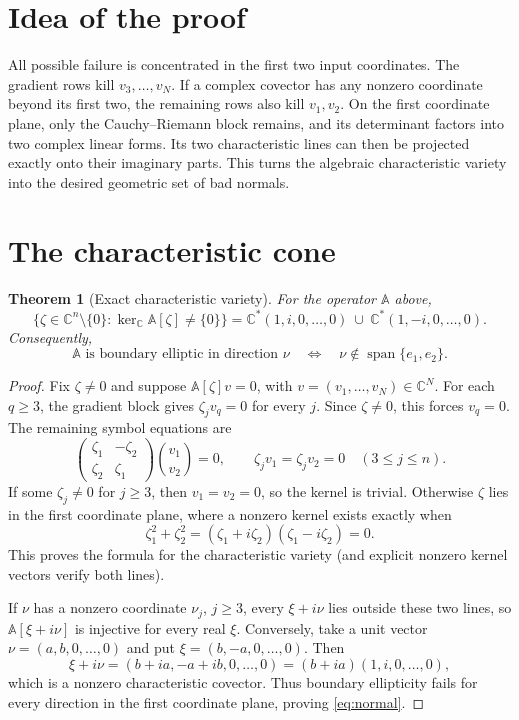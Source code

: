 \documentclass[11pt]{article}
\newtheorem{theorem}{Theorem}
\newcommand{\C}{\mathbb C}
\newcommand{\A}{\mathbb A}
\begin{document}
\section{Idea of the proof}

All possible failure is concentrated in the first two input coordinates.
The gradient rows kill $v_3,\ldots,v_N$.  If a complex covector has any
nonzero coordinate beyond its first two, the remaining rows also kill
$v_1,v_2$.  On the first coordinate plane, only the Cauchy--Riemann block
remains, and its determinant factors into two complex linear forms.  Its
two characteristic lines can then be projected exactly onto their
imaginary parts.  This turns the algebraic characteristic variety into
the desired geometric set of bad normals.

\section{The characteristic cone}

\begin{theorem}[Exact characteristic variety]\label{thm:cone}
For the operator $\A$ above,
\[
 \{\zeta\in\C^n\setminus\{0\}:\ker_{\C}\A[\zeta]\ne\{0\}\}
 =\C^*(1,i,0,\ldots,0)\ \cup\
   \C^*(1,-i,0,\ldots,0).
\]
Consequently,
\begin{equation}\label{eq:normal}
 \A\text{ is boundary elliptic in direction }\nu
 \quad\Longleftrightarrow\quad
 \nu\notin\operatorname{span}\{e_1,e_2\}.
\end{equation}
\end{theorem}

\begin{proof}
Fix $\zeta\ne0$ and suppose $\A[\zeta]v=0$, with
$v=(v_1,\ldots,v_N)\in\C^N$.  For each $q\ge3$, the gradient block gives
$\zeta_jv_q=0$ for every $j$.  Since $\zeta\ne0$, this forces
$v_q=0$.  The remaining symbol equations are
\[
 \begin{pmatrix}\zeta_1&-\zeta_2\\
                 \zeta_2& \zeta_1\end{pmatrix}
 \binom{v_1}{v_2}=0,
 \qquad
 \zeta_jv_1=\zeta_jv_2=0\quad(3\le j\le n).
\]
If some $\zeta_j\ne0$ for $j\ge3$, then $v_1=v_2=0$, so the kernel is
trivial.  Otherwise $\zeta$ lies in the first coordinate plane, where a
nonzero kernel exists exactly when
\[
 \zeta_1^2+\zeta_2^2
 = (\zeta_1+i\zeta_2)(\zeta_1-i\zeta_2)=0.
\]
This proves the formula for the characteristic variety (and explicit
nonzero kernel vectors verify both lines).

If $\nu$ has a nonzero coordinate $\nu_j$, $j\ge3$, every
$\xi+i\nu$ lies outside these two lines, so $\A[\xi+i\nu]$ is injective
for every real $\xi$.  Conversely, take a unit vector
$\nu=(a,b,0,\ldots,0)$ and put
$\xi=(b,-a,0,\ldots,0)$.  Then
\[
 \xi+i\nu=(b+ia,-a+ib,0,\ldots,0)
 =(b+ia)(1,i,0,\ldots,0),
\]
which is a nonzero characteristic covector.  Thus boundary ellipticity
fails for every direction in the first coordinate plane, proving
\eqref{eq:normal}.
\end{proof}
\end{document}
